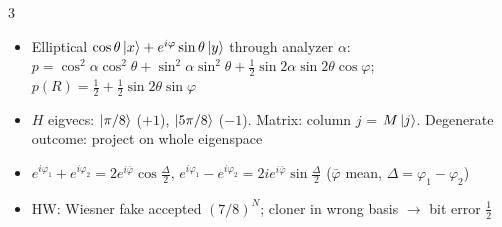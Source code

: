 \documentclass[10pt]{article}
\begin{document}
\begin{multicols*}{3}
\begin{itemize}
  \item Elliptical $\cos\theta\ket x+e^{i\varphi}\sin\theta\ket y$ through analyzer $\alpha$: $p=\cos^2\!\alpha\cos^2\!\theta+\sin^2\!\alpha\sin^2\!\theta+\tfrac12\sin2\alpha\sin2\theta\cos\varphi$; $p(R)=\tfrac12+\tfrac12\sin2\theta\sin\varphi$
  \item $H$ eigvecs: $\ket{\pi/8}$ ($+1$), $\ket{5\pi/8}$ ($-1$). Matrix: column $j$ = $M\ket j$. Degenerate outcome: project on whole eigenspace
  \item $e^{i\varphi_1}+e^{i\varphi_2}=2e^{i\bar\varphi}\cos\tfrac\Delta2$, $e^{i\varphi_1}-e^{i\varphi_2}=2ie^{i\bar\varphi}\sin\tfrac\Delta2$ ($\bar\varphi$ mean, $\Delta=\varphi_1-\varphi_2$)
  \item HW: Wiesner fake accepted $(7/8)^N$; cloner in wrong basis $\to$ bit error $\tfrac12$
\end{itemize}
\end{multicols*}
\end{document}
